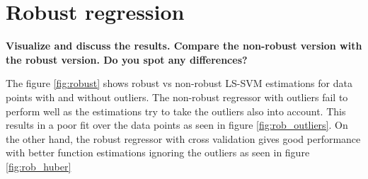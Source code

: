 \section{Robust regression}
\textbf{Visualize and discuss the results. Compare the non-robust version with the robust
	version. Do you spot any differences?}

The figure \ref{fig:robust} shows robust vs non-robust LS-SVM estimations for data points with and without outliers. The non-robust regressor with outliers fail to perform well as the estimations try to take the outliers also into account. This results in a poor fit over the data points as seen in figure \ref{fig:rob_outliers}. On the other hand, the robust regressor with cross validation gives good performance with better function estimations ignoring the outliers as seen in figure \ref{fig:rob_huber}\\\\

